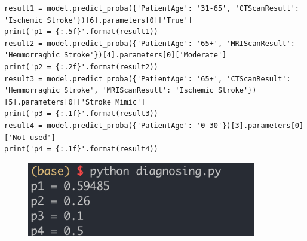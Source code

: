 \documentclass[a4paper, 11pt]{article}
\begin{document}
\begin{lstlisting}[title=diagnosing.py]
result1 = model.predict_proba({'PatientAge': '31-65', 'CTScanResult': 'Ischemic Stroke'})[6].parameters[0]['True']
print('p1 = {:.5f}'.format(result1))
result2 = model.predict_proba({'PatientAge': '65+', 'MRIScanResult': 'Hemmorraghic Stroke'})[4].parameters[0]['Moderate']
print('p2 = {:.2f}'.format(result2))
result3 = model.predict_proba({'PatientAge': '65+', 'CTScanResult': 'Hemmorraghic Stroke', 'MRIScanResult': 'Ischemic Stroke'})[5].parameters[0]['Stroke Mimic']
print('p3 = {:.1f}'.format(result3))
result4 = model.predict_proba({'PatientAge': '0-30'})[3].parameters[0]['Not used']
print('p4 = {:.1f}'.format(result4))
\end{lstlisting}

\begin{figure}[ht]
\centering
\includegraphics[width=10cm]{Pic/my_diagnosing.png}
\end{figure}

%
%
\end{document}
